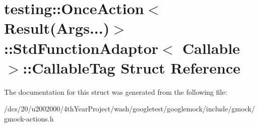 \hypertarget{structtesting_1_1OnceAction_3_01Result_07Args_8_8_8_08_4_1_1StdFunctionAdaptor_1_1CallableTag}{}\section{testing\+:\+:Once\+Action$<$ Result(Args...)$>$\+:\+:Std\+Function\+Adaptor$<$ Callable $>$\+:\+:Callable\+Tag Struct Reference}
\label{structtesting_1_1OnceAction_3_01Result_07Args_8_8_8_08_4_1_1StdFunctionAdaptor_1_1CallableTag}


The documentation for this struct was generated from the following file\+:\begin{DoxyCompactItemize}
\item 
/dcs/20/u2002000/4th\+Year\+Project/wash/googletest/googlemock/include/gmock/gmock-\/actions.\+h\end{DoxyCompactItemize}
